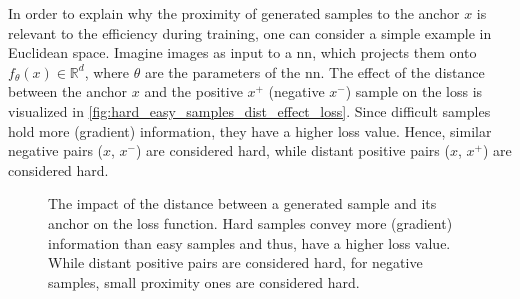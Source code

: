 In order to explain why the proximity of generated samples to the anchor $x$ is relevant to the efficiency during training, 
one can consider a simple example in Euclidean space.
Imagine images as input to a \ac{nn}, which projects them onto $f_{\theta}(x) \in \mathbb{R}^d$, where $\theta$ are the parameters of the \ac{nn}.
The effect of the distance between the anchor $x$ and the positive $x^+$ (negative $x^-$) sample on the loss is visualized in \autoref{fig:hard_easy_samples_dist_effect_loss}.
Since difficult samples hold more (gradient) information, they have a higher loss value.
Hence, similar negative pairs ($x$, $x^-$) are considered hard, while distant positive pairs ($x$, $x^+$) are considered hard.

\begin{figure}[h] %
    \centering
    
    \caption{The impact of the distance between a generated sample and its anchor on the loss function.
    Hard samples convey more (gradient) information than easy samples and thus, have a higher loss value.
    While distant positive pairs are considered hard, for negative samples, small proximity ones are considered hard.}
    \label{fig:hard_easy_samples_dist_effect_loss}
\end{figure}